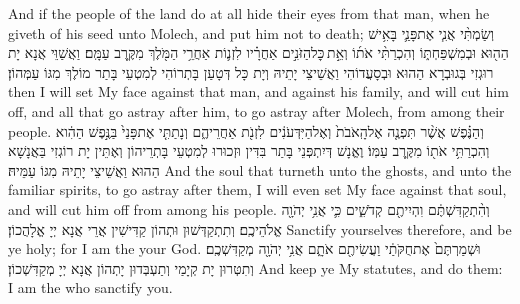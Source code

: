 {And if the people of the land do at all hide their eyes from that man, when he giveth of his seed unto Molech, and put him not to death;}{}
{וְשַׂמְתִּ֨י אֲנִ֧י אֶת\maqqaf פָּנַ֛י בָּאִ֥ישׁ הַה֖וּא וּבְמִשְׁפַּחְתּ֑וֹ וְהִכְרַתִּ֨י אֹת֜וֹ וְאֵ֣ת \legarmeh  כׇּל\maqqaf הַזֹּנִ֣ים אַחֲרָ֗יו לִזְנ֛וֹת אַחֲרֵ֥י הַמֹּ֖לֶךְ מִקֶּ֥רֶב עַמָּֽם׃}
{וַאֲשַׁוֵּי אֲנָא יָת רוּגְזִי בְּגוּבְרָא הַהוּא וּבְסָעֲדוֹהִי וַאֲשֵׁיצֵי יָתֵיהּ וְיָת כָּל דְּטָעַן בָּתְרוֹהִי לְמִטְעֵי בָּתַר מוֹלֶךְ מִגּוֹ עַמְּהוֹן׃}
{then I will set My face against that man, and against his family, and will cut him off, and all that go astray after him, to go astray after Molech, from among their people.}{}
{וְהַנֶּ֗פֶשׁ אֲשֶׁ֨ר תִּפְנֶ֤ה אֶל\maqqaf הָֽאֹבֹת֙ וְאֶל\maqqaf הַיִּדְּעֹנִ֔ים לִזְנֹ֖ת אַחֲרֵיהֶ֑ם וְנָתַתִּ֤י אֶת\maqqaf פָּנַי֙ בַּנֶּ֣פֶשׁ הַהִ֔וא וְהִכְרַתִּ֥י אֹת֖וֹ מִקֶּ֥רֶב עַמּֽוֹ׃}
{וֶאֱנָשׁ דְּיִתְפְּנֵי בָּתַר בִּדִּין וּזְכוּרוּ לְמִטְעֵי בָּתְרֵיהוֹן וְאֶתֵּין יָת רוֹגְזִי בַּאֲנָשָׁא הַהוּא וַאֲשֵׁיצֵי יָתֵיהּ מִגּוֹ עַמֵּיהּ׃}
{And the soul that turneth unto the ghosts, and unto the familiar spirits, to go astray after them, I will even set My face against that soul, and will cut him off from among his people.}{}
{וְהִ֨תְקַדִּשְׁתֶּ֔ם וִהְיִיתֶ֖ם קְדֹשִׁ֑ים כִּ֛י אֲנִ֥י יְהֹוָ֖ה אֱלֹהֵיכֶֽם׃}
{וְתִתְקַדְּשׁוּן וּתְהוֹן קַדִּישִׁין אֲרֵי אֲנָא יְיָ אֱלָהֲכוֹן׃}
{Sanctify yourselves therefore, and be ye holy; for I am the \lord\space your God.}{}
{וּשְׁמַרְתֶּם֙ אֶת\maqqaf חֻקֹּתַ֔י וַעֲשִׂיתֶ֖ם אֹתָ֑ם אֲנִ֥י יְהֹוָ֖ה מְקַדִּשְׁכֶֽם׃}
{וְתִטְּרוּן יָת קְיָמַי וְתַעְבְּדוּן יָתְהוֹן אֲנָא יְיָ מְקַדִּשְׁכוֹן׃}
{And keep ye My statutes, and do them: I am the \lord\space who sanctify you.}{}
